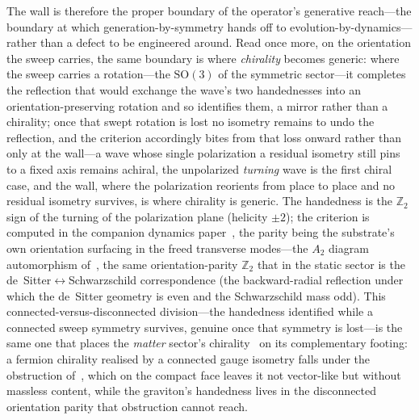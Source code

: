 \documentclass[11pt,a4paper]{article}
\theoremstyle{definition}
\begin{document}
The wall is therefore the proper boundary of the operator's generative reach---the boundary at which generation-by-symmetry hands off to evolution-by-dynamics---rather than a defect to be engineered around. Read once more, on the orientation the sweep carries, the same boundary is where \emph{chirality} becomes generic: where the sweep carries a rotation---the $\mathrm{SO}(3)$ of the symmetric sector---it completes the reflection that would exchange the wave's two handednesses into an orientation-preserving rotation and so identifies them, a mirror rather than a chirality; once that swept rotation is lost no isometry remains to undo the reflection, and the criterion accordingly bites from that loss onward rather than only at the wall---a wave whose single polarization a residual isometry still pins to a fixed axis remains achiral, the unpolarized \emph{turning} wave is the first chiral case, and the wall, where the polarization reorients from place to place and no residual isometry survives, is where chirality is generic. The handedness is the $\mathbb{Z}_2$ sign of the turning of the polarization plane (helicity $\pm2$); the criterion is computed in the companion dynamics paper~\cite{JanzenDynamics}, the parity being the substrate's own orientation surfacing in the freed transverse modes---the $A_{2}$ diagram automorphism of~\cite{JanzenGroupoid}, the same orientation-parity $\mathbb{Z}_{2}$ that in the static sector is the de~Sitter$\leftrightarrow$Schwarzschild correspondence (the backward-radial reflection under which the de~Sitter geometry is even and the Schwarzschild mass odd). This connected-versus-disconnected division---the handedness identified while a connected sweep symmetry survives, genuine once that symmetry is lost---is the same one that places the \emph{matter} sector's chirality~\cite{JanzenMatter} on its complementary footing: a fermion chirality realised by a connected gauge isometry falls under the obstruction of~\cite{JanzenBoundary}, which on the compact face leaves it not vector-like but without massless content, while the graviton's handedness lives in the disconnected orientation parity that obstruction cannot reach.
\end{document}
